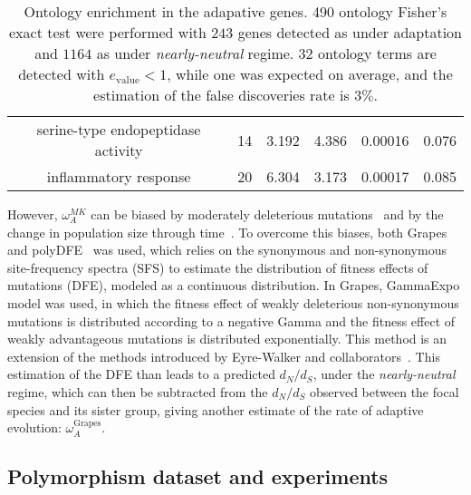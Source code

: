 \documentclass{article}
\newcommand{\dn}{d_N}
\newcommand{\ds}{d_S}
\newcommand{\dnds}{\dn / \ds}
\begin{document}
\begin{table*}[hb!]
\begin{adjustbox}{width = 1\textwidth}
\begin{tabular}{|c|c|c|c|c|c|}
	serine-type endopeptidase activity & 14 & 3.192 & 4.386 & 0.00016 & 0.076 \\
	inflammatory response & 20 & 6.304 & 3.173 & 0.00017 & 0.085 \\
	\hline
\end{tabular}
\end{adjustbox}
\label{table:ontology}
\caption{
 Ontology enrichment in the adapative genes.
 490 ontology Fisher's exact test were performed with $243$ genes detected as under adaptation and $1164$ as under \textit{nearly-neutral} regime.
 $32$ ontology terms are detected with $e_{\mathrm{value}} < 1$, while one was expected on average, and the estimation of the false discoveries rate is $3\%$.
}
\end{table*}

However, $\omega_A^{MK}$ can be biased by moderately deleterious mutations~\citep{eyre-walker_quantifying_2002} and by the change in population size through time~\citep{eyre-walker_changing_2002}.
To overcome this biases, both Grapes~\citep{galtier_adaptive_2016} and polyDFE~\citep{tataru_polydfe_2020} was used, which relies on the synonymous and non-synonymous site-frequency spectra (SFS) to estimate the distribution of fitness effects of mutations (DFE), modeled as a continuous distribution.
In Grapes, GammaExpo model was used, in which the fitness effect of weakly deleterious non-synonymous mutations is distributed according to a negative Gamma and the fitness effect of weakly advantageous mutations is distributed exponentially.
This method is an extension of the methods introduced by Eyre-Walker and collaborators~\citep{eyre-walker_distribution_2006, eyre-walker_estimating_2009}.
This estimation of the DFE than leads to a predicted $\dnds$, under the \textit{nearly-neutral} regime, which can then be subtracted from the $\dnds$ observed between the focal species and its sister group, giving another estimate of the rate of adaptive evolution: $\omega_A^{\text{Grapes}}$.

\subsection*{Polymorphism dataset and experiments}
\end{document}
